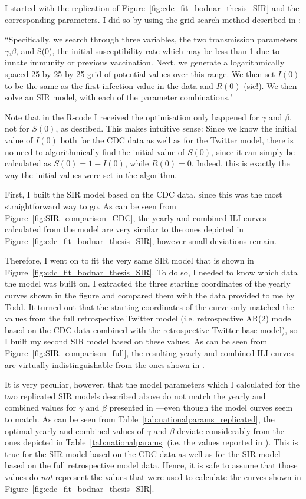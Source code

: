 \documentclass[11pt, a4paper,twoside]{report}\usepackage[]{graphicx}\usepackage[]{color}
\begin{document}
I started with the replication of Figure~\ref{fig:cdc_fit_bodnar_thesis_SIR} and the corresponding parameters. I did so by using the grid-search method described in \cite{bodnar_data_2015}: 

``Specifically, we search through three variables, the two transmission parameters $\gamma$,$\beta$, and S(0), the initial susceptibility rate which may be less than 1 due to innate immunity or previous vaccination. Next, we generate a logarithmically spaced 25 by 25 by 25 grid of potential values over this range. We then set $I(0)$ to be the same as the first infection value in the data and $R(0)$ (sic!). We then solve an SIR model, with each of the parameter combinations." 

Note that in the R-code I received the optimisation only happened for $\gamma$ and $\beta$, not for $S(0)$, as desribed. This makes intuitive sense: Since we know the initial value of $I(0)$ both for the CDC data as well as for the Twitter model, there is no need to algorithmically find the initial value of $S(0)$, since it can simply be calculated as $S(0)=1-I(0)$, while $R(0)=0$. Indeed, this is exactly the way the initial values were set in the algorithm.

First, I built the SIR model based on the CDC data, since this was the most straightforward way to go. As can be seen from Figure~\ref{fig:SIR_comparison_CDC}, the yearly and combined ILI curves calculated from the model are very similar to the ones depicted in Figure~\ref{fig:cdc_fit_bodnar_thesis_SIR}, however small deviations remain.

Therefore, I went on to fit the very same SIR model that is shown in Figure~\ref{fig:cdc_fit_bodnar_thesis_SIR}. To do so, I needed to know which data the model was built on. I extracted the three starting coordinates of the yearly curves shown in the figure and compared them with the data provided to me by Todd. It turned out that the starting coordinates of the curve only matched the values from the full retrospective Twitter model (i.e. retrospective AR(2) model based on the CDC data combined with the retrospective Twitter base model), so I built my second SIR model based on these values. As can be seen from Figure~\ref{fig:SIR_comparison_full}, the resulting yearly and combined ILI curves are virtually indistinguishable from the ones shown in \cite{bodnar_data_2015}.

It is very peculiar, however, that the model parameters which I calculated for the two replicated SIR models described above do not match the yearly and combined values for $\gamma$ and $\beta$ presented in \citep{bodnar_data_2015}---even though the model curves seem to match. As can be seen from Table~\ref{tab:nationalparams_replicated}, the optimal yearly and combined values of $\gamma$ and $\beta$ deviate considerably from the ones depicted in Table~\ref{tab:nationalparams} (i.e. the values reported in \citep{bodnar_data_2015}). This is true for the SIR model based on the CDC data as well as for the SIR model based on the full retrospective model data. Hence, it is safe to assume that those values do \textit{not} represent the values that were used to calculate the curves shown in Figure~\ref{fig:cdc_fit_bodnar_thesis_SIR}.
\end{document}
